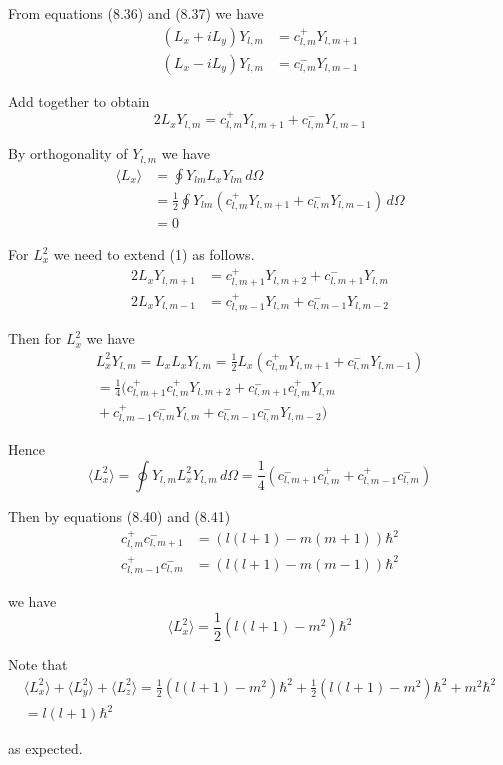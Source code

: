 


\bigskip
From equations (8.36) and (8.37) we have
\begin{align*}
(L_x+iL_y)Y_{l,m}&=c_{l,m}^+Y_{l,m+1}
\\
(L_x-iL_y)Y_{l,m}&=c_{l,m}^-Y_{l,m-1}
\end{align*}

Add together to obtain
\begin{equation*}
2L_xY_{l,m}=c_{l,m}^+Y_{l,m+1}+c_{l,m}^-Y_{l,m-1}
\tag{1}
\end{equation*}

By orthogonality of $Y_{l,m}$ we have
\begin{align*}
\langle L_x\rangle&=\oint Y_{lm}L_xY_{lm}\,d\Omega
\\
&=\frac{1}{2}\oint Y_{lm}\left(c_{l,m}^+Y_{l,m+1}+c_{l,m}^-Y_{l,m-1}\right)\,d\Omega
\\
&=0
\end{align*}

For $L_x^2$ we need to extend (1) as follows.
\begin{align*}
2L_xY_{l,m+1}&=c_{l,m+1}^+Y_{l,m+2}+c_{l,m+1}^-Y_{l,m}
\\
2L_xY_{l,m-1}&=c_{l,m-1}^+Y_{l,m}+c_{l,m-1}^-Y_{l,m-2}
\end{align*}

Then for $L_x^2$ we have
\begin{multline*}
L_x^2Y_{l,m}=L_xL_xY_{l,m}
=\frac{1}{2}L_x\left(c_{l,m}^+Y_{l,m+1}+c_{l,m}^-Y_{l,m-1}\right)
\\
{}=\frac{1}{4}\biggl(
 c_{l,m+1}^+c_{l,m}^+Y_{l,m+2}
+c_{l,m+1}^-c_{l,m}^+Y_{l,m}
\\
{}+c_{l,m-1}^+c_{l,m}^-Y_{l,m}
+c_{l,m-1}^-c_{l,m}^-Y_{l,m-2}
\biggr)
\end{multline*}

Hence
\begin{equation*}
\langle L_x^2\rangle=\oint Y_{l,m}L_x^2Y_{l,m}\,d\Omega=\frac{1}{4}
\left(c_{l,m+1}^-c_{l,m}^++c_{l,m-1}^+c_{l,m}^-\right)
\end{equation*}

Then by equations (8.40) and (8.41)
\begin{align*}
c_{l,m}^+c_{l,m+1}^-&=(l(l+1)-m(m+1))\hbar^2\tag{8.40}
\\
c_{l,m-1}^+c_{l,m}^-&=(l(l+1)-m(m-1))\hbar^2\tag{8.41}
\end{align*}

we have
\begin{equation*}
\langle L_x^2\rangle=\frac{1}{2}\left(l(l+1)-m^2\right)\hbar^2
\end{equation*}

Note that
\begin{multline*}
\langle L_x^2\rangle+\langle L_y^2\rangle+\langle L_z^2\rangle
=\frac{1}{2}\left(l(l+1)-m^2\right)\hbar^2
+\frac{1}{2}\left(l(l+1)-m^2\right)\hbar^2
+m^2\hbar^2
\\
{}=l(l+1)\hbar^2
\end{multline*}

as expected.


